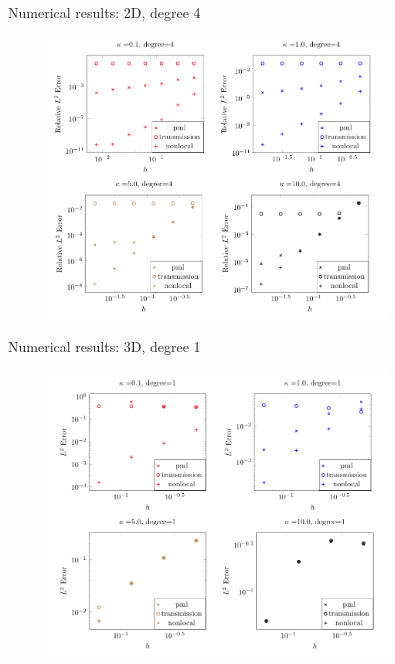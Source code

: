\documentclass{beamer}
\begin{document}
\begin{frame}[noframenumbering]{Numerical results: 2D, degree 4}
    \begin{figure}[ht]
    \begin{center}
        \includegraphics[width=0.8\textwidth]{images/degree-4-accuracy.png}
    \end{center}
    \end{figure}
\end{frame}
\begin{frame}[noframenumbering]{Numerical results: 3D, degree 1}
    \begin{figure}[ht]
    \begin{center}
        \includegraphics[width=0.8\textwidth]{images/3d-accuracy.png}
    \end{center}
    \end{figure}
\end{frame}
\end{document}
